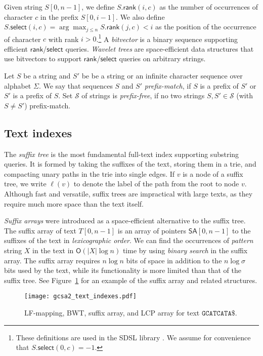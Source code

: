 \documentclass[a4paper,UKenglish]{lipics-v2016}
\newcommand{\abs}[1]{\ensuremath{\lvert #1 \rvert}}
\newcommand{\Oh}[1]{\ensuremath{\mathsf{O}\!\left( #1 \right)}}
\newcommand{\dnaseq}[1]{\ensuremath{\mathtt{#1}}}
\newcommand{\rank}{\ensuremath{\mathsf{rank}}}
\newcommand{\select}{\ensuremath{\mathsf{select}}}
\newcommand{\LFmapping}{LF\nobreakdash-mapping}
\newcommand{\SA}{\ensuremath{\mathsf{SA}}}
\begin{document}
Given string $S[0, n-1]$, we define $S.\rank(i, c)$ as the number of occurrences of character $c$ in the prefix $S[0, i-1]$. We also define $S.\select(i, c) = \arg \max_{j \le n} S.\rank(j, c) < i$ as the position of the occurrence of character $c$ with rank $i > 0$.\footnote{These definitions are used in the SDSL library \cite{Gog2014b}. We assume for convenience that $S.\select(0, c) = -1$.} A \emph{bitvector} is a binary sequence supporting efficient $\rank$/$\select$ queries. \emph{Wavelet trees} \cite{Grossi2003} are space-efficient data structures that use bitvectors to support $\rank$/$\select$ queries on arbitrary strings.

Let $S$ be a string and $S'$ be be a string or an infinite character sequence over alphabet $\Sigma$. We say that sequences $S$ and $S'$ \emph{prefix-match}, if $S$ is a prefix of $S'$ or $S'$ is a prefix of $S$. Set $\mathcal{S}$ of strings is \emph{prefix-free}, if no two strings $S, S' \in \mathcal{S}$ (with $S \ne S'$) prefix-match.

\subsection{Text indexes}

The \emph{suffix tree} \cite{Weiner1973} is the most fundamental full-text index supporting substring queries. It is formed by taking the suffixes of the text, storing them in a trie, and compacting unary paths in the trie into single edges. If $v$ is a node of a suffix tree, we write $\ell(v)$ to denote the label of the path from the root to node $v$. Although fast and versatile, suffix trees are impractical with large texts, as they require much more space than the text itself.

\emph{Suffix arrays} \cite{Manber1993} were introduced as a space-efficient alternative to the suffix tree. The suffix array of text $T[0, n-1]$ is an array of pointers $\SA[0, n-1]$ to the suffixes of the text in \emph{lexicographic order}. We can find the occurrences of \emph{pattern} string $X$ in the text in $\Oh{\abs{X} \log n}$ time by using \emph{binary search} in the suffix array. The suffix array requires $n \log n$ bits of space in addition to the $n \log \sigma$ bits used by the text, while its functionality is more limited than that of the suffix tree. See Figure~\ref{figure:indexes} for an example of the suffix array and related structures.

\begin{figure}[t!]
\texttt{[image: gcsa2\_text\_indexes.pdf]}
\caption{\LFmapping, BWT, suffix array, and LCP array for text $\dnaseq{GCATCATA}\$$.}\label{figure:indexes}
\end{figure}
\end{document}

